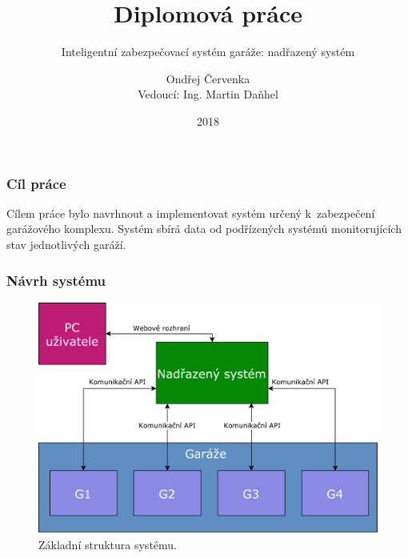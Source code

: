 \documentclass{beamer}
\title
{Diplomová práce}
\subtitle{Inteligentní zabezpečovací systém garáže: nadřazený systém }
\author
{Ondřej Červenka \\ Vedoucí: Ing. Martin Daňhel}
\institute
{
  České vysoké učení technické v Praze\\
  Fakulta informačních technologií
}
\date{2018}
\begin{document}
  \frame{\titlepage}
  \begin{frame}
    \frametitle{Cíl práce}

    Cílem práce bylo navrhnout a implementovat systém určený k~zabezpečení garážového komplexu. Systém sbírá data od podřízených systémů monitorujících stav jednotlivých garáží.



  \end{frame}

  \begin{frame}
    \frametitle{Návrh systému}

    \begin{figure}
        \includegraphics[scale=0.3]{../images/basic_struct.pdf}
        \caption{Základní struktura systému.}
      \end{figure}

  \end{frame}
\end{document}
